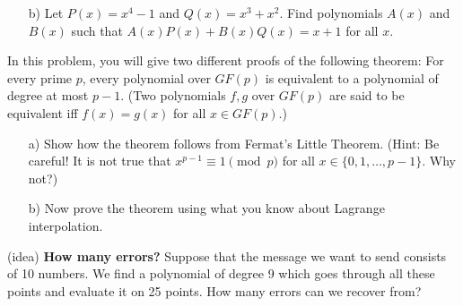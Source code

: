 \documentclass[]{article}
\newif\ifsolutions
\renewcommand{\answer}[1]{{\color{mydarkblue}\textbf{Solution:}#1}}
\begin{document}
\begin{qunlist}
\begin{itemize}
\qpart
\item[b)] Let $P(x) = x^4 - 1$ and $Q(x) = x^3 + x^2$.
Find polynomials $A(x)$ and $B(x)$ such that $A(x) P(x) + B(x) Q(x) = x + 1$ for all $x$. 


\ifsolutions{\answer
{
P(x)
}}\fi


\end{itemize}



\qpart


 In this problem, you will give two different proofs of the following theorem: For every prime $p$, every polynomial over $GF(p)$ is equivalent to a polynomial of degree at most $p-1$. (Two polynomials $f,g$ over $GF(p)$ are said to be equivalent iff $f(x)=g(x)$ for all $x\in GF(p)$.)
\begin{enumerate}

 \qpart
\item[a)] Show how the theorem follows from Fermat's Little Theorem. (Hint: Be careful! It is not true that $x^{p-1}\equiv 1\pmod{p}$ for all $x\in\{0,1,\ldots,p-1\}$. Why not?)
\qpart
\item[b)] Now prove the theorem using what you know about Lagrange interpolation.

\end{enumerate}


\ifsolutions{ \answer
{
 From Fermat's Little Theorem, we know $\forall x \not\equiv 0, \text{ } x^{p-1} \equiv 1 \pmod{p}$. \\
Multiplying both sides by $x$, and noting that $0^p \equiv 0 \pmod{p}$, we can see that 
$$\forall x, \text{ } x^p \equiv x \pmod{p}.$$
Therefore, any $x^k$, where $k \geq p$ will be equivalent to $x^n$, where $n \in \{0, 1, \dots, p-1\}$, and will have a degree at most $p - 1$. 

Since a polynomial $f$ of degree $d$ is described completely by $d + 1$ points, we cannot specify a polynomial of degree $\geq p$ because $f(p) = f(0)$ (and so forth for other values larger than $p$) over $GF(p)$. Thus, we can only specify at most $p$ unique points.\\
Therefore, every polynomial is equivalent to a polynomial of degree at most $p - 1$.
}} \fi

\qpart
(idea) {\bf How many errors?}
Suppose that the message we want to send consists of 10 numbers. We find a polynomial of degree 9 which goes through all these points and evaluate it on 25 points. How many errors can we recover from?


\end{qunlist}
\end{document}
